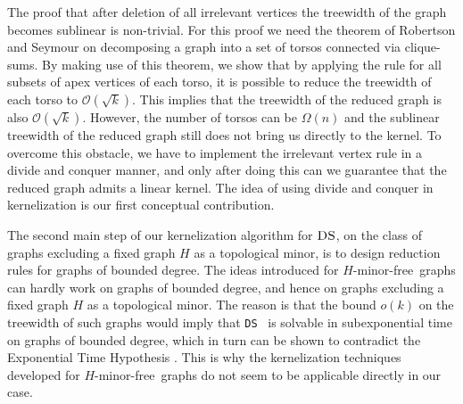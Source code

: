 \documentclass[11pt]{article}
\newcommand{\Hmf}{$H$-minor-free}
\newcommand{\tDS}{{\texttt{\sc DS}}}
\newcommand{\cO}{\mathcal{O}}
\begin{document}
The proof that after deletion of all irrelevant vertices the treewidth of the graph becomes sublinear is non-trivial.  For this proof we 
  need  the   theorem of Robertson and Seymour \cite{RobertsonS03}    on decomposing a graph into a set  of torsos connected via clique-sums. By making use of this theorem, we show that by applying the rule for all subsets of apex vertices of  each torso, it is possible to  reduce the treewidth  of each torso to $\cO(\sqrt{k})$. This implies that the treewidth of the reduced graph is also $\cO(\sqrt{k})$. However,  the number of torsos can be $\Omega(n)$ and the sublinear treewidth of the reduced graph  still does not bring us directly to the kernel. To  overcome this obstacle, we have to implement the irrelevant vertex rule  in a divide and conquer manner, and only after doing this can we guarantee that the reduced graph admits a linear kernel.  The idea of using divide and conquer in kernelization is our first conceptual contribution. 
  









The second main step of our kernelization algorithm for $\tDS$, on  the class of graphs excluding a fixed graph $H$ as a topological minor, is to design reduction rules for graphs of bounded degree. 
The ideas introduced for \Hmf \, graphs  can hardly  work on graphs of bounded degree, and hence on   graphs excluding a fixed graph $H$ as a topological minor. The reason is that the bound $o(k)$ on the treewidth of such graphs   would imply that  \tDS
\, is solvable in subexponential time on graphs of bounded degree, which in turn can be shown to contradict the  Exponential Time Hypothesis       
\cite{ImpagliazzoPZ01}. This is why the kernelization techniques developed for \Hmf \, graphs do not seem to be applicable directly in our case.
\end{document}
